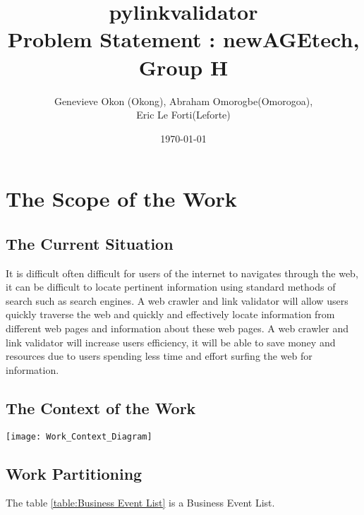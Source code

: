 \documentclass[12pt]{article}
\begin{document}
\title{pylinkvalidator \\
 Problem Statement : newAGEtech, Group H }
\author{Genevieve Okon (Okong), Abraham Omorogbe(Omorogoa),\\
 Eric Le Forti(Leforte)}
\date{\today}
\maketitle

	
\section{The Scope of the Work }

\subsection{The Current Situation}

It is difficult often difficult for users of the internet to navigates through the web, it can be difficult to locate pertinent information using standard methods of search such as search engines. A web crawler and link validator will allow users quickly traverse the web and quickly and effectively locate information from different web pages and information about these web pages. A web crawler and link validator will increase users efficiency, it will be able to save money and resources due to users spending less time and effort surfing the web for information.\newline

\subsection{The Context of the Work }
\texttt{[image: Work\_Context\_Diagram]}
\subsection{Work Partitioning}
The table \ref{table:Business Event List} is a Business Event List.
\end{document}
